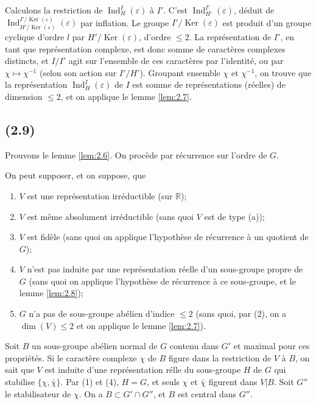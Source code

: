 \documentclass[11pt]{amsart}
\theoremstyle{plain}
\theoremstyle{definition}
\DeclareMathOperator{\Ind}{Ind}
\DeclareMathOperator{\Ker}{Ker}
\newcommand{\R}{\mathbb{R}}
\begin{document}
Calculons la restriction de $\Ind_H^I(\varepsilon)$ \`a $I'$. C'est $\Ind_{H'}^{I'}(\varepsilon)$, d\'eduit de $\Ind_{H'/\Ker(\varepsilon)}^{I'/\Ker(\varepsilon)}(\varepsilon)$ par inflation. Le groupe $I'/\Ker(\varepsilon)$ est produit d'un groupe cyclique d'ordre $l$ par $H'/\Ker(\varepsilon)$, d'ordre $\le2$. La repr\'esentation de $I'$, en tant que repr\'esentation complexe, est donc somme de caract\`eres complexes distincts, et $I/I'$ agit sur l'ensemble de ces caract\`eres par l'identit\'e, ou par $\chi\mapsto\chi^{-1}$ (selon son action sur $I'/H'$). Groupant ensemble $\chi$ et $\chi^{-1}$, on trouve que la repr\'esentation $\Ind_H^I(\varepsilon)$ de $I$ est somme de repr\'esentations (r\'eelles) de dimension $\le2$, et on applique le lemme \ref{lem:2.7}.

\subsection{(2.9)}
Prouvons le lemme \ref{lem:2.6}. On proc\`ede par r\'ecurrence sur l'ordre de $G$.

On peut supposer, et on suppose, que
\begin{enumerate}
\item[(1)] $V$ est une repr\'esentation irr\'eductible (sur $\R$);
\item[(2)] $V$ est m\^eme absolument irr\'eductible (sans quoi $V$ est de type (a));
\item[(3)] $V$ est fid\`ele (sans quoi on applique l'hypoth\`ese de r\'ecurrence \`a un quotient de $G$);
\item[(4)] $V$ n'est pas induite par une repr\'esentation r\'eelle d'un sous-groupe propre de $G$ (sans quoi on applique l'hypoth\`ese de r\'ecurrence \`a ce sous-groupe, et le lemme \ref{lem:2.8});
\item[(5)] $G$ n'a pas de sous-groupe ab\'elien d'indice $\le2$ (sans quoi, par (2), on a $\dim(V)\le2$ et on applique le lemme \ref{lem:2.7}).
\end{enumerate}

Soit $B$ un sous-groupe ab\'elien normal de $G$ contenu dans $G'$ et maximal pour ces propri\'et\'es. Si le caract\`ere complexe $\chi$ de $B$ figure dans la restriction de $V$ \`a $B$, on sait que $V$ est induite d'une repr\'esentation r\'elle du sous-groupe $H$ de $G$ qui stabilise $\{\chi,\bar{\chi}\}$. Par (1) et (4), $H=G$, et seuls $\chi$ et $\bar{\chi}$ figurent dans $V|B$. Soit $G''$ le stabilisateur de $\chi$. On a $B\subset G'\cap G''$, et $B$ est central dans $G''$.
\end{document}
